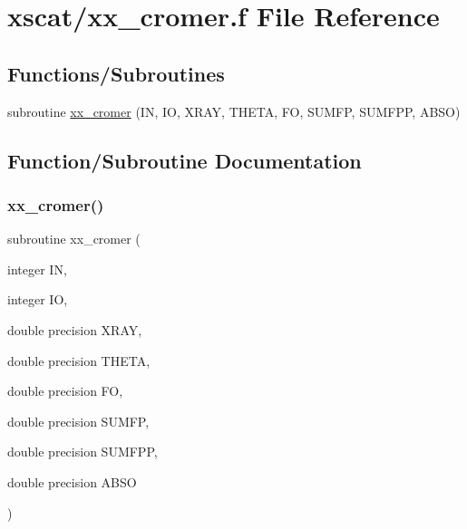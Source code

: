 \hypertarget{xx__cromer_8f}{}\section{xscat/xx\+\_\+cromer.f File Reference}
\label{xx__cromer_8f}
\subsection*{Functions/\+Subroutines}
\begin{DoxyCompactItemize}
\item 
subroutine \hyperlink{xx__cromer_8f_aba5e903e13abd26dbe88e432df7d6680}{xx\+\_\+cromer} (IN, IO, X\+R\+AY, T\+H\+E\+TA, FO, S\+U\+M\+FP, S\+U\+M\+F\+PP, A\+B\+SO)
\end{DoxyCompactItemize}


\subsection{Function/\+Subroutine Documentation}
\mbox{\label{xx__cromer_8f_aba5e903e13abd26dbe88e432df7d6680}} 
\subsubsection{\texorpdfstring{xx\+\_\+cromer()}{xx\_cromer()}}
{\footnotesize\ttfamily subroutine xx\+\_\+cromer (\begin{DoxyParamCaption}\item[{integer}]{IN,  }\item[{integer}]{IO,  }\item[{double precision}]{X\+R\+AY,  }\item[{double precision}]{T\+H\+E\+TA,  }\item[{double precision}]{FO,  }\item[{double precision}]{S\+U\+M\+FP,  }\item[{double precision}]{S\+U\+M\+F\+PP,  }\item[{double precision}]{A\+B\+SO }\end{DoxyParamCaption})}

